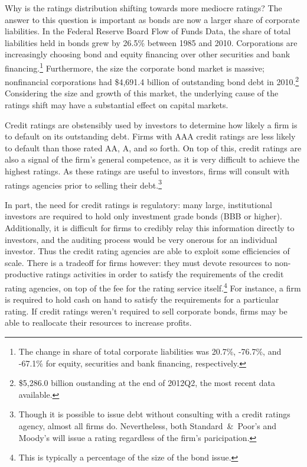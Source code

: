 \documentclass[notitlepage]{article}
\begin{document}
Why is the ratings distribution shifting towards more mediocre ratings? The answer to this question is important as bonds are now a larger share of corporate liabilities. In the Federal Reserve Board Flow of Funds Data, the share of total liabilities held in bonds grew by 26.5\% between 1985 and 2010. Corporations are increasingly choosing bond and equity financing over other securities and bank financing.\footnote{The change in share of total corporate liabilities was 20.7\%, -76.7\%, and -67.1\% for equity, securities and bank financing, respectively.} Furthermore, the size the corporate bond market is massive; nonfinancial corporations had \$4,691.4 billion of outstanding bond debt in 2010.\footnote{\$5,286.0 billion oustanding at the end of 2012Q2, the most recent data available.} Considering the size and growth of this market, the underlying cause of the ratings shift may have a substantial effect on capital markets.

Credit ratings are obstensibly used by investors to determine how likely a firm is to default on its outstanding debt. Firms with AAA credit ratings are less likely to default than those rated AA, A, and so forth. On top of this, credit ratings are also a signal of the firm's general competence, as it is very difficult to achieve the highest ratings. As these ratings are useful to investors, firms will consult with ratings agencies prior to selling their debt.\footnote{Though it is possible to issue debt without consulting with a credit ratings agency, almost all firms do. Nevertheless, both Standard~\&~Poor's and Moody's will issue a rating regardless of the firm's paricipation.}

In part, the need for credit ratings is regulatory: many large, institutional investors are required to hold only investment grade bonds (BBB or higher). Additionally, it is difficult for firms to credibly relay this information directly to investors, and the auditing process would be very onerous for an individual investor. Thus the credit rating agencies are able to exploit some efficiencies of scale. There is a tradeoff for firms however: they must devote resources to non-productive ratings activities in order to satisfy the requirements of the credit rating agencies, on top of the fee for the rating service itself.\footnote{This is typically a percentage of the size of the bond issue.} For instance, a firm is required to hold cash on hand to satisfy the requirements for a particular rating. If credit ratings weren't required to sell corporate bonds, firms may be able to reallocate their resources to increase profits.
\end{document}
